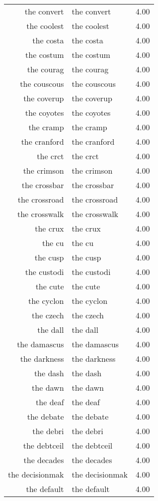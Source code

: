 \begin{table}[ht]
\begin{tabular}{rlr}
  the convert & the convert & 4.00 \\ 
  the coolest & the coolest & 4.00 \\ 
  the costa & the costa & 4.00 \\ 
  the costum & the costum & 4.00 \\ 
  the courag & the courag & 4.00 \\ 
  the couscous & the couscous & 4.00 \\ 
  the coverup & the coverup & 4.00 \\ 
  the coyotes & the coyotes & 4.00 \\ 
  the cramp & the cramp & 4.00 \\ 
  the cranford & the cranford & 4.00 \\ 
  the crct & the crct & 4.00 \\ 
  the crimson & the crimson & 4.00 \\ 
  the crossbar & the crossbar & 4.00 \\ 
  the crossroad & the crossroad & 4.00 \\ 
  the crosswalk & the crosswalk & 4.00 \\ 
  the crux & the crux & 4.00 \\ 
  the cu & the cu & 4.00 \\ 
  the cusp & the cusp & 4.00 \\ 
  the custodi & the custodi & 4.00 \\ 
  the cute & the cute & 4.00 \\ 
  the cyclon & the cyclon & 4.00 \\ 
  the czech & the czech & 4.00 \\ 
  the dall & the dall & 4.00 \\ 
  the damascus & the damascus & 4.00 \\ 
  the darkness & the darkness & 4.00 \\ 
  the dash & the dash & 4.00 \\ 
  the dawn & the dawn & 4.00 \\ 
  the deaf & the deaf & 4.00 \\ 
  the debate & the debate & 4.00 \\ 
  the debri & the debri & 4.00 \\ 
  the debtceil & the debtceil & 4.00 \\ 
  the decades & the decades & 4.00 \\ 
  the decisionmak & the decisionmak & 4.00 \\ 
  the default & the default & 4.00 \\ 

\end{tabular}
\end{table}
